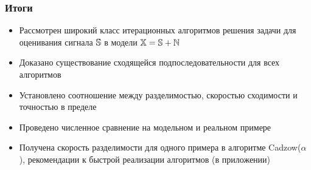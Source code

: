 \documentclass[unicode, notheorems]{beamer}
\begin{document}

\begin{frame}
	\frametitle{Итоги}
	\begin{itemize}
		\item Рассмотрен широкий класс итерационных алгоритмов решения задачи 
		для оценивания сигнала $\mathbb{S}$  в модели $\mathbb{X} = \mathbb{S} + \mathbb{N}$
		\item Доказано существование сходящейся подпоследовательности для всех алгоритмов
		\item Установлено соотношение между разделимостью, скоростью сходимости и точностью в пределе
		\item Проведено численное сравнение на модельном и реальном примере
		\item Получена скорость разделимости для одного примера в алгоритме Cadzow($\alpha$), рекомендации к быстрой реализации алгоритмов (в приложении)
	\end{itemize}
	
\end{frame}


\end{document}
